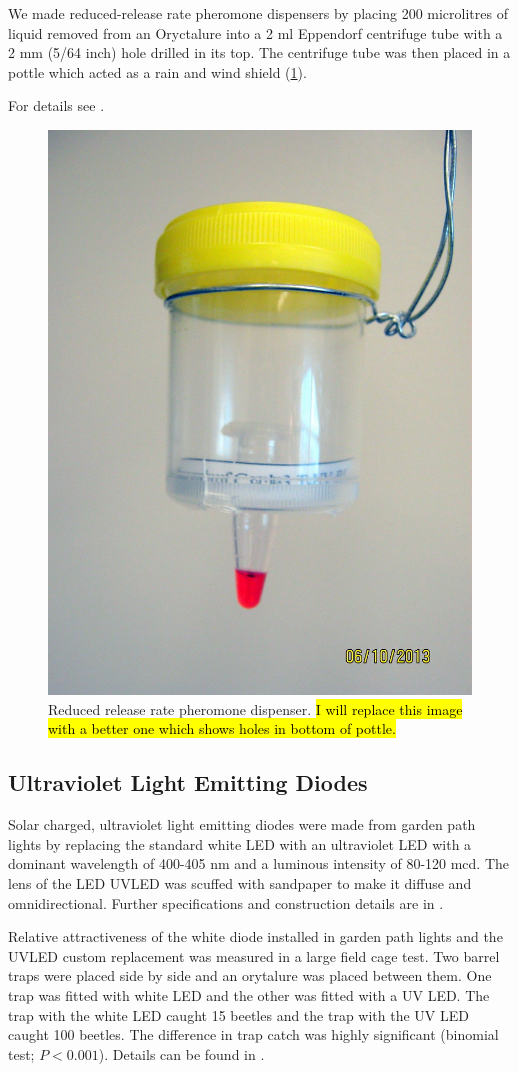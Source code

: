 \documentclass[12pt,letterpaper,english,bibliography=totocnumbered, abstract=on]{scrartcl}
\begin{document}
We made reduced-release
rate pheromone dispensers by placing 200 microlitres of liquid removed from an Oryctalure into a 2 ml Eppendorf
centrifuge tube with a 2 mm (5/64 inch) hole drilled in its top. The centrifuge tube was then placed
in a pottle which acted as a rain and wind shield (\ref{fig:reduced-release-rate-device}).

For details see \cite{moore_technical_2013}.

\begin{figure}[h]
	\centering
	\includegraphics[width=0.5\linewidth]{images/reduced-release-rate-device}
	\caption{
		Reduced release rate pheromone dispenser.
		\hl{I will replace this image with a better one which shows holes in bottom of pottle.}}
	\label{fig:reduced-release-rate-device}
\end{figure}


\clearpage

\subsection{Ultraviolet Light Emitting Diodes}

Solar charged, ultraviolet light emitting diodes were made from garden path lights by replacing the standard white LED with an ultraviolet LED with a dominant wavelength of 400-405 nm and a luminous intensity of 80-120 mcd. The lens of the LED UVLED was scuffed with sandpaper to make it diffuse and omnidirectional. Further specifications and construction details are in \cite{moore_solar_2013}.

Relative attractiveness of the white diode installed in garden path lights and the UVLED custom replacement was measured in a large field cage test. Two barrel traps were placed side by side and an orytalure was placed between them. One trap was fitted with white LED and the other was fitted with a UV LED.  The trap with the white LED caught 15 beetles and the trap with the UV LED caught 100 beetles. The difference in trap catch was highly significant (binomial test; $P<0.001$). Details can be found in \cite{moore_relative_2014}.
\end{document}
